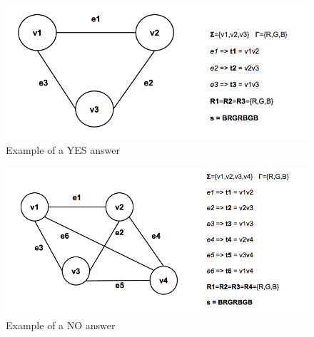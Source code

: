 \documentclass[paper=a4, fontsize=11pt]{scrartcl}
\numberwithin{equation}{section}		%
\numberwithin{figure}{section}			%
\numberwithin{table}{section}				%
\begin{document}
    
     \begin{figure}[h]
     	\centering
     	\includegraphics[scale=0.4]{imgs/graph1}
     	\caption{Example of a YES answer}\label{fig:1}
     \end{figure}
     \begin{figure}[h
     	]
     	\centering
     	\includegraphics[scale=0.4]{imgs/graph2}
     	\caption{Example of a NO answer}\label{fig:1}
     \end{figure}
\end{document}
